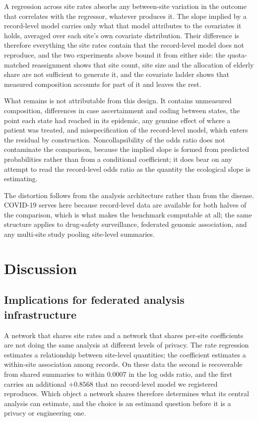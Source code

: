 \documentclass[11pt]{article}
\begin{document}
A regression across site rates absorbs any between-site variation in the
outcome that correlates with the regressor, whatever produces it.  The
slope implied by a record-level model carries only what that model
attributes to the covariates it holds, averaged over each site's own
covariate distribution.  Their difference is therefore everything the
site rates contain that the record-level model does not reproduce, and
the two experiments above bound it from either side: the quota-matched
reassignment shows that site count, site size and the allocation of
elderly share are not sufficient to generate it, and the covariate
ladder shows that measured composition accounts for part of it and
leaves the rest.

What remains is not attributable from this design.  It contains
unmeasured composition, differences in case ascertainment and coding
between states, the point each state had reached in its epidemic, any
genuine effect of where a patient was treated, and misspecification of
the record-level model, which enters the residual by construction.
Noncollapsibility of the odds ratio
\cite{greenland1999noncollapsibility} does not contaminate the
comparison, because the implied slope is formed from predicted
probabilities rather than from a conditional coefficient; it does bear
on any attempt to read the record-level odds ratio as the quantity the
ecological slope is estimating.

The distortion follows from the analysis architecture rather than from
the disease.  COVID-19 serves here because record-level data are
available for both halves of the comparison, which is what makes the
benchmark computable at all; the same structure applies to drug-safety
surveillance, federated genomic association, and any multi-site study
pooling site-level summaries.

\section{Discussion}

\subsection{Implications for federated analysis infrastructure}

A network that shares site rates and a network that shares per-site
coefficients are not doing the same analysis at different levels of
privacy.  The rate regression estimates a relationship between
site-level quantities; the coefficient estimates a within-site
association among records.  On these data the second is recoverable from
shared summaries to within $0.0007$ in the log odds ratio, and the
first carries an additional $+0.8568$ that no record-level model we
registered reproduces.  Which object a network shares therefore
determines what its central analysis can estimate, and the choice is an
estimand question before it is a privacy or engineering one.
\end{document}
